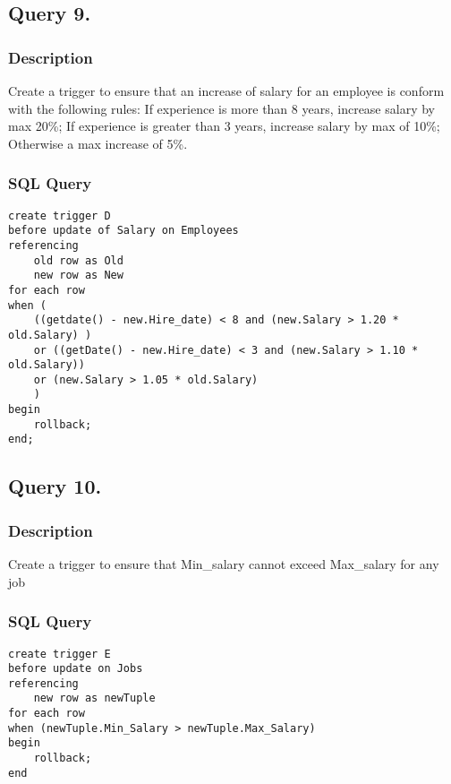 \documentclass[a4paper]{article}
\begin{document}
\subsection{Query 9.}
\subsubsection{Description}
Create a trigger to ensure that an increase of salary for an employee is conform
with the following rules: If experience is more than 8 years, increase salary by
max 20\%; If experience is greater than 3 years, increase salary by max of 10\%;
Otherwise a max increase of 5\%.
\subsubsection{SQL Query}
\begin{lstlisting}
create trigger D
before update of Salary on Employees
referencing 
    old row as Old
    new row as New
for each row
when (
    ((getdate() - new.Hire_date) < 8 and (new.Salary > 1.20 * old.Salary) )
    or ((getDate() - new.Hire_date) < 3 and (new.Salary > 1.10 * old.Salary))
    or (new.Salary > 1.05 * old.Salary)
    )
begin
    rollback;
end;
\end{lstlisting}

\newpage
\subsection{Query 10.}
\subsubsection{Description}
Create a trigger to ensure that Min\_salary cannot exceed Max\_salary for any job
\subsubsection{SQL Query}
\begin{lstlisting}
create trigger E
before update on Jobs
referencing 
    new row as newTuple
for each row
when (newTuple.Min_Salary > newTuple.Max_Salary)
begin 
    rollback;
end 
\end{lstlisting}
\end{document}
